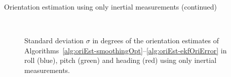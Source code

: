 \begin{myexample}{Orientation estimation using only inertial measurements (continued)}
\begin{figure}[t]
	\centering
	 \\
  \caption{Standard deviation $\sigma$ in degrees of the orientation estimates of Algorithms~\ref{alg:oriEst-smoothingOpt}--\ref{alg:oriEst-ekfOriError} in roll (blue), pitch (green) and heading (red) using only inertial measurements.}
  \label{fig:oriEst-noMagDataCovAll}
\end{figure}
\end{myexample}

